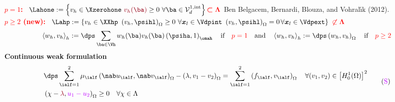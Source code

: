 \begin{frame}
{\\
\vspace{0.4 cm}
\textcolor{red}{\textbf{$p = 1$:}} \ $\Lahone \egaldef \left\{v_h \in \Xzerohone \  \textcolor{carmine}{v_h(\ba)} \geq 0 \ \forall \ba \in \mathcal{V}_{d}^{1,\mathrm{int}} \right\} \textcolor{red}{\bm \subset \bm \Lambda}$ \scriptsize{Ben Belgacem, Bernardi, Blouza, and Vohral{\'{\i}}k (2012)}.\\
\vspace{0.4 cm}
\normalsize{\textcolor{red}{\textbf{$p \geq 2$ (\textcolor{cadmiumgreen}{\textbf{new}}):}} \ $\Lahp \egaldef \left\{v_h \in \XXhp \ \left(v_h ,\psihl \right)_{\Omega} \geq 0 \ \forall \xl \in \Vdpint \ \left(v_h,\psihl\right)_{\Omega} = 0 \hspace{0.05 cm} \forall \xl \in \Vdpext\right\}$ $\textcolor{red}{\bm \not \subset \bm \Lambda}$} 
\vspace{0.4 cm}
\begin{equation*}
\left\langle w_h ,v_h \right\rangle_h \egaldef \dps \sum_{\ba \in \Vh} w_h(\ba) v_h(\ba) \left(\psiha,1\right)_{\omah}  \quad \mbox{if} \quad \textcolor{red}{\textbf{$p=1$}} \quad \mbox{and} \quad \left \langle w_h ,v_h \right\rangle_h  \egaldef \dps \left(w_h, v_h\right)_{\Omega} \quad \mbox{if} \quad \textcolor{red}{\textbf{$p \geq 2$}}
\end{equation*}
\vspace{0.2 cm}
\textcolor{cadmiumgreen}{\textbf{Continuous weak formulation}}
\begin{equation*}
\begin{split}
& \dps \sum_{\ialf=1}^2 \mu_\ialf \left(\nab u_\ialf,\nab v_\ialf\right)_{\Omega} - \left(\lambda,v_1-v_2\right)_{\Omega} = \sum_{\ialf=1}^2\left(f_\ialf,v_\ialf\right)_{\Omega} \quad \forall (v_1,v_2) \in \left[H_0^1(\Omega)\right]^2 \\
& \left(\chi - \textcolor{carmine}{\lambda},\textcolor{electricpurple}{u_1-u_2}\right)_{\Omega} \geq 0 
\quad \forall \chi \in \Lambda 
\end{split}
 \tag{$\textcolor{electricpurple}{\mathrm{S}}$}
\end{equation*}
}


\end{frame}
